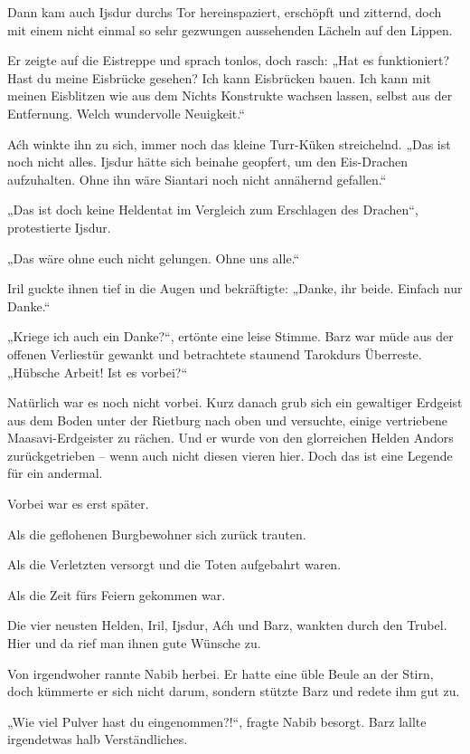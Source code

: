 Dann kam auch Ijsdur durchs Tor hereinspaziert, erschöpft und zitternd, doch mit einem nicht einmal so sehr gezwungen aussehenden Lächeln auf den Lippen.

Er zeigte auf die Eistreppe und sprach tonlos, doch rasch: „Hat es funktioniert? Hast du meine Eisbrücke gesehen? Ich kann Eisbrücken bauen. Ich kann mit meinen Eisblitzen wie aus dem Nichts Konstrukte wachsen lassen, selbst aus der Entfernung. Welch wundervolle Neuigkeit.“

Aćh winkte ihn zu sich, immer noch das kleine Turr-Küken streichelnd. „Das ist noch nicht alles. Ijsdur hätte sich beinahe geopfert, um den Eis-Drachen aufzuhalten. Ohne ihn wäre Siantari noch nicht annähernd gefallen.“

„Das ist doch keine Heldentat im Vergleich zum Erschlagen des Drachen“, protestierte Ijsdur.

„Das wäre ohne euch nicht gelungen. Ohne uns alle.“

Iril guckte ihnen tief in die Augen und bekräftigte: „Danke, ihr beide. Einfach nur Danke.“

„Kriege ich auch ein Danke?“, ertönte eine leise Stimme. Barz war müde aus der offenen Verliestür gewankt und betrachtete staunend Tarokdurs Überreste. „Hübsche Arbeit! Ist es vorbei?“



\trennzeichen



Natürlich war es noch nicht vorbei. Kurz danach grub sich ein gewaltiger Erdgeist aus dem Boden unter der Rietburg nach oben und versuchte, einige vertriebene Maasavi-Erdgeister zu rächen. Und er wurde von den glorreichen Helden Andors zurückgetrieben – wenn auch nicht diesen vieren hier. Doch das ist eine Legende für ein andermal.

Vorbei war es erst später.

Als die geflohenen Burgbewohner sich zurück trauten.

Als die Verletzten versorgt und die Toten aufgebahrt waren.

Als die Zeit fürs Feiern gekommen war.

Die vier neusten Helden, Iril, Ijsdur, Aćh und Barz, wankten durch den Trubel. Hier und da rief man ihnen gute Wünsche zu.

Von irgendwoher rannte Nabib herbei. Er hatte eine üble Beule an der Stirn, doch kümmerte er sich nicht darum, sondern stützte Barz und redete ihm gut zu.

„Wie viel Pulver hast du eingenommen?!“, fragte Nabib besorgt. Barz lallte irgendetwas halb Verständliches.

